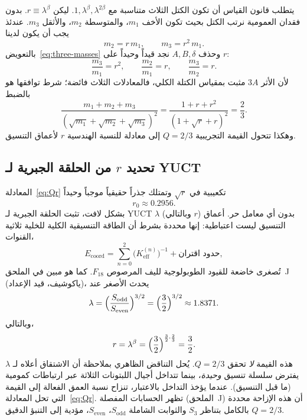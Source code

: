 \documentclass[12pt,a4paper]{article}
\begin{document}
	يتطلب قانون القياس أن تكون الكتل الثلاث متناسبة مع \(1, \lambda^{\beta}, \lambda^{2\beta}\). ليكن \(r \equiv \lambda^{\beta}\). بدون فقدان العمومية نرتب الكتل بحيث تكون الأخف \(m_1\)، والمتوسطة \(m_2\)، والأثقل \(m_3\). عندئذ يجب أن يكون لدينا
	\begin{equation}
		m_2 = r\, m_1, \qquad m_3 = r^2\, m_1 .
	\end{equation}
	بالتعويض~\eqref{eq:three-masses} وحذف \(A,B,\delta\) نجد قيداً وحيداً على \(r\):
	\begin{equation}
		\frac{m_3}{m_1} = r^2, \qquad
		\frac{m_2}{m_1} = r, \qquad
		\frac{m_3}{m_2} = r .
	\end{equation}
	لأن الأثر \(3A\) مثبت بمقياس الكتلة الكلي، فالمعادلات الثلاث فائضة؛ شرط توافقها هو بالضبط
	\begin{equation}
		\frac{m_1 + m_2 + m_3}{(\sqrt{m_1}+\sqrt{m_2}+\sqrt{m_3})^2}
		= \frac{1 + r + r^2}{(1 + \sqrt{r} + r)^2} = \frac{2}{3}.
		\label{eq:Qr}
	\end{equation}
	وهكذا تتحول القيمة التجريبية \(Q=2/3\) إلى معادلة للنسبة الهندسية \(r\) لأعماق التنسيق.
	
	\subsection{تحديد \(r\) من الحلقة الجبرية لـ YUCT}
	
	المعادلة~\eqref{eq:Qr} تكعيبية في \(\sqrt{r}\) وتمتلك جذراً حقيقياً موجباً وحيداً
	\begin{equation}
		r_0 \approx 0.2956 .
	\end{equation}
	بشكل لافت، تثبت الحلقة الجبرية لـ YUCT \(\lambda\) (وبالتالي \(r\)) بدون أي معامل حر. أعماق التنسيق ليست اعتباطية: إنها محددة بشرط أن الطاقة التنسيقية الكلية للخلية ثلاثية القنوات،
	\begin{equation}
		E_{\mathrm{coord}} = \sum_{n=0}^{2} \bigl(K_{\mathrm{eff}}^{(n)}\bigr)^{-1}
		+ \text{حدود اقتران},
	\end{equation}
	تُصغرى خاضعة للقيود الطوبولوجية لليف المرصوص \(F_{18}\). كما هو مبين في الملحق~J (ياكوشيف، قيد الإعداد)، يحدث الأصغر عند
	\begin{equation}
		\lambda = \Bigl(\frac{S_{\mathrm{odd}}}{S_{\mathrm{even}}}\Bigr)^{3/2}
		= \Bigl(\frac{3}{2}\Bigr)^{3/2} \approx 1.8371 .
	\end{equation}
	وبالتالي،
	\begin{equation}
		r = \lambda^{\beta} = \Bigl(\frac{3}{2}\Bigr)^{\frac{3}{2}\cdot\frac{2}{3}}
		= \frac{3}{2} .
	\end{equation}
	هذه القيمة \emph{لا} تحقق \(Q=2/3\). يُحل التناقض الظاهري بملاحظة أن الاشتقاق أعلاه لـ \(\lambda\) يفترض سلسلة تنسيق \emph{وحيدة}، بينما تتداخل أجيال اللبتونات الثلاثة عبر ارتباطات كمومية (ما قبل التنسيق). عندما يؤخذ التداخل بالاعتبار، تنزاح نسبة العمق الفعالة إلى القيمة التي تحل المعادلة~\eqref{eq:Qr}. تظهر الحسابات المفصلة (الملحق~J) أن هذه الإزاحة محددة بالكامل بتناظر \(S_3\) والثوابت الشاملة \(S_{\mathrm{odd}}\)، \(S_{\mathrm{even}}\)، مؤدية إلى التنبؤ الدقيق \(Q=2/3\).
	
\end{document}
